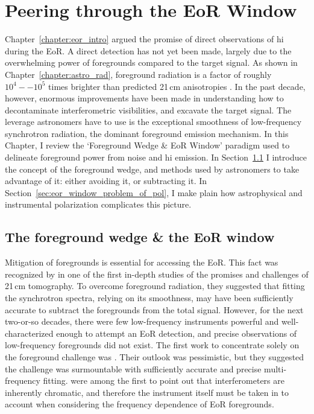 \chapter{Peering through the EoR Window}
\label{chapter:eor_window_theory}

Chapter~\ref{chapter:eor_intro} argued the promise of direct observations of {\sc hi} during the EoR. A direct detection has not yet been made, largely due to the overwhelming power of foregrounds compared to the target signal. As shown in Chapter~\ref{chapter:astro_rad}, foreground radiation is a factor of roughly $10^4 -- 10^5$ times brighter than predicted 21\,cm anisotropies .  In the past decade, however, enormous improvements have been made in understanding how to decontaminate interferometric visibilities, and excavate the target signal. The leverage astronomers have to use is the exceptional smoothness of low-frequency synchrotron radiation, the dominant foreground emission mechanism. In this Chapter, I review the `Foreground Wedge \& EoR Window' paradigm used to delineate foreground power from noise and {\sc hi} emission. In Section~\ref{sec:eor_window_foreground_wedge} I introduce the concept of the foreground wedge, and methods used by astronomers to take advantage of it: either avoiding it, or subtracting it. In Section~\ref{sec:eor_window_problem_of_pol}, I make plain how astrophysical and instrumental polarization complicates this picture.

\section{The foreground wedge \& the EoR window}  %
\label{sec:eor_window_foreground_wedge}

Mitigation of foregrounds is essential for accessing the EoR. This fact was recognized by \cite{Madau.97} in one of the first in-depth studies of the promises and challenges of 21\,cm tomography. To overcome foreground radiation, they suggested that fitting the synchrotron spectra, relying on its smoothness, may have been sufficiently accurate to subtract the foregrounds from the total signal.
However, for the next two-or-so decades, there were few low-frequency instruments powerful and well-characterized enough to attempt an EoR detection, and precise observations of low-frequency foregrounds did not exist. The first work to concentrate solely on the foreground challenge was \cite{DiMatteo.02}. Their outlook was pessimistic, but they suggested the challenge was surmountable with sufficiently accurate and precise multi-frequency fitting. \cite{Peng.03} were among the first to point out that interferometers are inherently chromatic, and therefore the instrument itself must be taken in to account when considering the frequency dependence of EoR foregrounds.

